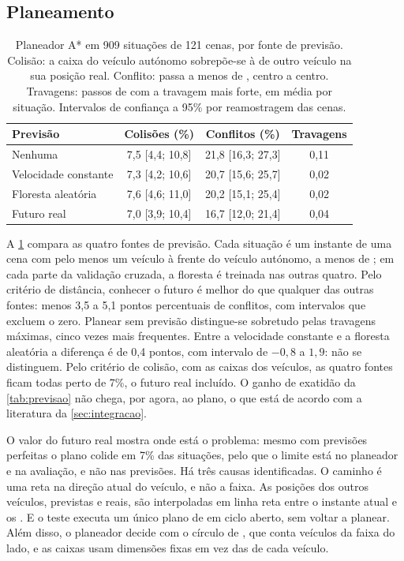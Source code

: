 \subsection{Planeamento}


\begin{table}[t]
\centering
\caption{Planeador A* em 909 situações de 121 cenas, por fonte de
  previsão. Colisão: a caixa do veículo autónomo sobrepõe-se à de outro
  veículo na sua posição real. Conflito: passa a menos de ,
  centro a centro. Travagens: passos de  com a travagem mais
  forte, em média por situação. Intervalos de confiança a 95\% por
  reamostragem das cenas.}
\label{tab:planeamento}
\begin{tabular*}{\textwidth}{@{\extracolsep{\fill}}lccc@{}}
\toprule
Previsão & Colisões (\%) & Conflitos (\%) & Travagens \\
\midrule
Nenhuma & 7,5 [4,4; 10,8] & 21,8 [16,3; 27,3] & 0,11 \\
Velocidade constante & 7,3 [4,2; 10,6] & 20,7 [15,6; 25,7] & 0,02 \\
Floresta aleatória & 7,6 [4,6; 11,0] & 20,2 [15,1; 25,4] & 0,02 \\
Futuro real & 7,0 [3,9; 10,4] & 16,7 [12,0; 21,4] & 0,04 \\
\bottomrule
\end{tabular*}
\end{table}

A \cref{tab:planeamento} compara as quatro fontes de previsão. Cada
situação é um instante de uma cena com pelo menos um veículo à frente do
veículo autónomo, a menos de ; em cada parte da validação
cruzada, a floresta é treinada nas outras quatro. Pelo critério de
distância, conhecer o futuro é melhor do que qualquer das outras fontes:
menos 3,5 a 5,1 pontos percentuais de conflitos, com intervalos que
excluem o zero. Planear sem previsão distingue-se sobretudo pelas
travagens máximas, cinco vezes mais frequentes. Entre a velocidade
constante e a floresta aleatória a diferença é de 0,4 pontos, com
intervalo de $-0,8$ a $1,9$: não se distinguem. Pelo critério de
colisão, com as caixas dos veículos, as quatro fontes ficam todas perto
de 7\%, o futuro real incluído. O ganho de exatidão da
\cref{tab:previsao} não chega, por agora, ao plano, o que está de acordo
com a literatura da \cref{sec:integracao}.

O valor do futuro real mostra onde está o problema: mesmo com previsões
perfeitas o plano colide em 7\% das situações, pelo que o limite está no
planeador e na avaliação, e não nas previsões. Há três causas
identificadas. O caminho é uma reta na direção atual do veículo, e não a
faixa. As posições dos outros veículos, previstas e reais, são
interpoladas em linha reta entre o instante atual e os . E o
teste executa um único plano de  em ciclo aberto, sem voltar a
planear. Além disso, o planeador decide com o círculo de ,
que conta veículos da faixa do lado, e as caixas usam dimensões fixas em
vez das de cada veículo.
